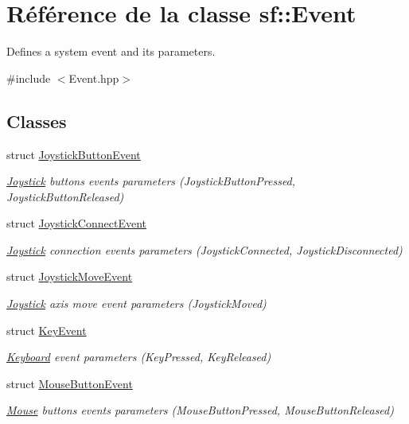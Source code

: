 \hypertarget{classsf_1_1Event}{}\section{Référence de la classe sf\+:\+:Event}
\label{classsf_1_1Event}


Defines a system event and its parameters.  




{\ttfamily \#include $<$Event.\+hpp$>$}

\subsection*{Classes}
\begin{DoxyCompactItemize}
\item 
struct \hyperlink{structsf_1_1Event_1_1JoystickButtonEvent}{Joystick\+Button\+Event}
\begin{DoxyCompactList}\small\item\em \hyperlink{classsf_1_1Joystick}{Joystick} buttons events parameters (Joystick\+Button\+Pressed, Joystick\+Button\+Released) \end{DoxyCompactList}\item 
struct \hyperlink{structsf_1_1Event_1_1JoystickConnectEvent}{Joystick\+Connect\+Event}
\begin{DoxyCompactList}\small\item\em \hyperlink{classsf_1_1Joystick}{Joystick} connection events parameters (Joystick\+Connected, Joystick\+Disconnected) \end{DoxyCompactList}\item 
struct \hyperlink{structsf_1_1Event_1_1JoystickMoveEvent}{Joystick\+Move\+Event}
\begin{DoxyCompactList}\small\item\em \hyperlink{classsf_1_1Joystick}{Joystick} axis move event parameters (Joystick\+Moved) \end{DoxyCompactList}\item 
struct \hyperlink{structsf_1_1Event_1_1KeyEvent}{Key\+Event}
\begin{DoxyCompactList}\small\item\em \hyperlink{classsf_1_1Keyboard}{Keyboard} event parameters (Key\+Pressed, Key\+Released) \end{DoxyCompactList}\item 
struct \hyperlink{structsf_1_1Event_1_1MouseButtonEvent}{Mouse\+Button\+Event}
\begin{DoxyCompactList}\small\item\em \hyperlink{classsf_1_1Mouse}{Mouse} buttons events parameters (Mouse\+Button\+Pressed, Mouse\+Button\+Released) \end{DoxyCompactList}\item 

\end{DoxyCompactItemize}
